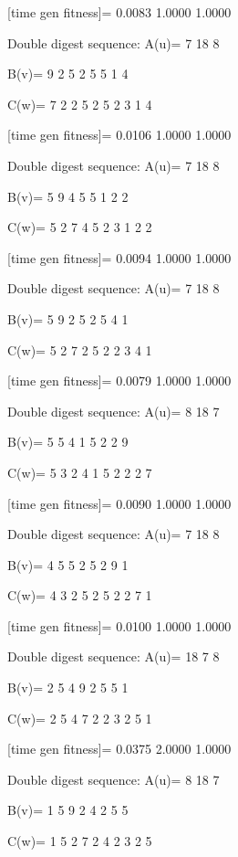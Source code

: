 [time gen fitness]=
    0.0083    1.0000    1.0000

Double digest sequence:
A(u)=
     7    18     8

B(v)=
     9     2     5     2     5     5     1     4

C(w)=
     7     2     2     5     2     5     2     3     1     4

[time gen fitness]=
    0.0106    1.0000    1.0000

Double digest sequence:
A(u)=
     7    18     8

B(v)=
     5     9     4     5     5     1     2     2

C(w)=
     5     2     7     4     5     2     3     1     2     2

[time gen fitness]=
    0.0094    1.0000    1.0000

Double digest sequence:
A(u)=
     7    18     8

B(v)=
     5     9     2     5     2     5     4     1

C(w)=
     5     2     7     2     5     2     2     3     4     1

[time gen fitness]=
    0.0079    1.0000    1.0000

Double digest sequence:
A(u)=
     8    18     7

B(v)=
     5     5     4     1     5     2     2     9

C(w)=
     5     3     2     4     1     5     2     2     2     7

[time gen fitness]=
    0.0090    1.0000    1.0000

Double digest sequence:
A(u)=
     7    18     8

B(v)=
     4     5     5     2     5     2     9     1

C(w)=
     4     3     2     5     2     5     2     2     7     1

[time gen fitness]=
    0.0100    1.0000    1.0000

Double digest sequence:
A(u)=
    18     7     8

B(v)=
     2     5     4     9     2     5     5     1

C(w)=
     2     5     4     7     2     2     3     2     5     1

[time gen fitness]=
    0.0375    2.0000    1.0000

Double digest sequence:
A(u)=
     8    18     7

B(v)=
     1     5     9     2     4     2     5     5

C(w)=
     1     5     2     7     2     4     2     3     2     5


